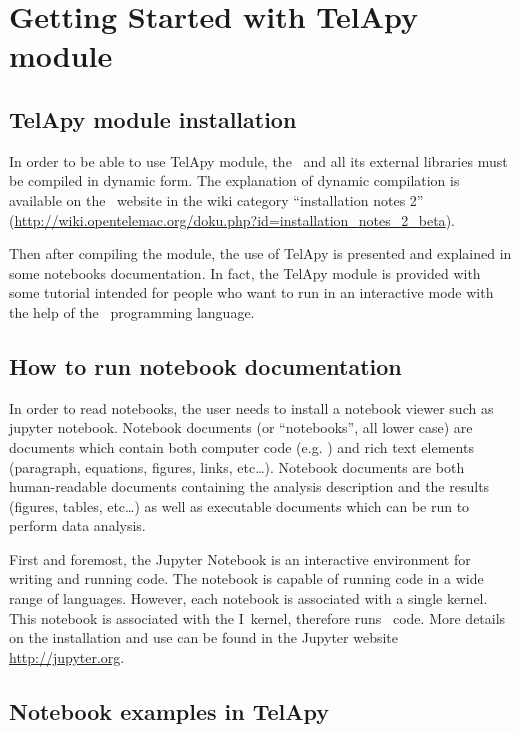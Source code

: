 \chapter{Getting Started with TelApy  module}\label{ch:inp:outp}

\section{TelApy module installation}

In order to be able to use TelApy module, the \telemacsystem\ and all its
external libraries must be compiled in dynamic form. The explanation of dynamic
compilation is available on the \telemacsystem\ website in the wiki category
``installation notes 2''
(\url{http://wiki.opentelemac.org/doku.php?id=installation_notes_2_beta}).

Then after compiling the module, the use of TelApy is presented and explained
in some notebooks documentation. In fact, the TelApy module is provided with
some tutorial intended for people who want to run  in an
interactive mode with the help of the \python\ programming language.

\section{How to run notebook documentation}

In order to read notebooks, the user needs to install a notebook viewer such as
jupyter notebook. Notebook documents (or ``notebooks'', all lower case) are
documents which contain both computer code (e.g. \python) and rich text elements
(paragraph, equations, figures, links, etc\ldots). Notebook documents are both
human-readable documents containing the analysis description and the results
(figures, tables, etc\ldots) as well as executable documents which can be run to
perform data analysis.

First and foremost, the Jupyter Notebook is an interactive environment for
writing and running code. The notebook is capable of running code in a wide
range of languages. However, each notebook is associated with a single kernel.
This notebook is associated with the I\python\ kernel, therefore runs \python\
code. More details on the installation and use can be found in the Jupyter
website \url{http://jupyter.org}.

\section{Notebook examples in TelApy}

